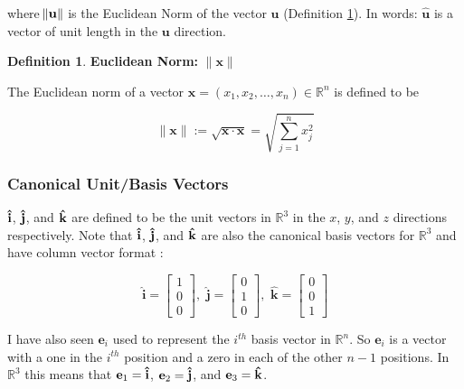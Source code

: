 \documentclass{article}
\theoremstyle{definition}
\newtheorem{definition}{Definition}[section]
\begin{document}
\bigskip
\noindent
where $\norm{\mathbf{u}}$ is the Euclidean Norm
of the vector $\mathbf{u}$ (Definition
\ref{def:euclidean_norm}). In words: $\hat{\mathbf{u}}$ 
is a vector of unit length in the $\mathbf{u}$ direction. 



\bigskip
\begin{definition}
\label{def:euclidean_norm}
{\bf Euclidean Norm:} $\|\mathbf{x}\|$


\bigskip
\noindent
The Euclidean norm of a vector $\mathbf{x} = (x_1,x_2,\ldots,
x_n) \in \mathbb{R}^{n}$ is defined to be

\bigskip
\begin{equation*}
\|\mathbf{x}\| := \sqrt{\mathbf{x} \cdot \mathbf{x}} =
\sqrt{\sum\limits_{j = 1}^{n} x_{j}^{2}}
\label{eqn:magnitude}
\end{equation*}
\end{definition}


\subsubsection{Canonical Unit/Basis Vectors}
$\mathbf{\hat{i}}$, $\mathbf{\hat{j}}$, and $\mathbf{\hat{k}}$ 
are defined to be the unit vectors in $\mathbb{R}^3$ in the $x$,
$y$, and $z$ directions respectively. Note that $\mathbf{\hat{i}}$, 
$\mathbf{\hat{j}}$, and $\mathbf{\hat{k}}$ are also the canonical 
basis vectors for $\mathbb{R}^3$ and have column vector format 
\cite{notes:basis}:

\bigskip
\begin{equation*}
{\displaystyle \mathbf {\hat {i}} 
= {\begin{bmatrix}1\\0\\0\end{bmatrix}},\,\,
\mathbf {\hat {j}} = {\begin{bmatrix}0\\1\\0\end{bmatrix}},\,\,
\mathbf {\hat {k}} = {\begin{bmatrix}0\\0\\1\end{bmatrix}}}
\end{equation*}

\medskip
\bigskip
\noindent
I have also seen $\mathbf{e}_i$ used to represent the $i^{th}$
basis vector in $\mathbb{R}^n$. So $\mathbf{e}_i$ is a vector
with a one in the $i^{th}$ position and a zero in each of the
other $n - 1$ positions.  In $\mathbb{R}^3$ this means that
$\mathbf{e}_1 = \mathbf{\hat{i}}$, $\mathbf{e}_2 =
\mathbf{\hat{j}}$, and $\mathbf{e}_3 = \mathbf{\hat{k}}$.
\end{document}
